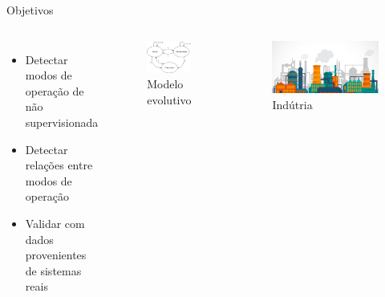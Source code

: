 \begin{frame}{Objetivos}
    \begin{columns}
        	\begin{itemize}
        	    \item Detectar modos de operação de não supervisionada
        	    \item Detectar relações entre modos de operação
        	    \item Validar com dados provenientes de sistemas reais
        	\end{itemize}
    	
        	\begin{figure}
        	    \centering
        	    \includegraphics[height=.18\textheight,keepaspectratio]{figuras/grafo_yuri.png}
        	    \caption{Modelo evolutivo}
        	    \label{fig:grafo_industria}
        	\end{figure}
        	\begin{figure}
        	    \centering
        	    \includegraphics[height=.18\textheight,keepaspectratio]{figuras/industria.jpg}
        	    \caption{Indútria}
        	    \label{fig:industria}
        	\end{figure}
    \end{columns}
\end{frame}
